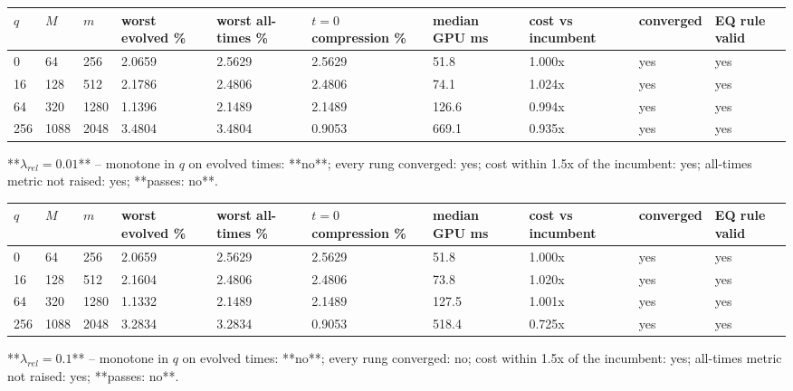 \documentclass[11pt]{article}
\begin{document}
\begin{table}[htbp]\centering\small
\begin{tabular}{llllllllll}\hline
$q$ & $M$ & $m$ & worst evolved \% & worst all-times \% & $t=0$ compression \% & median GPU ms & cost vs incumbent & converged & EQ rule valid \\ \hline
0 & 64 & 256 & 2.0659 & 2.5629 & 2.5629 & 51.8 & 1.000x & yes & yes \\
16 & 128 & 512 & 2.1786 & 2.4806 & 2.4806 & 74.1 & 1.024x & yes & yes \\
64 & 320 & 1280 & 1.1396 & 2.1489 & 2.1489 & 126.6 & 0.994x & yes & yes \\
256 & 1088 & 2048 & 3.4804 & 3.4804 & 0.9053 & 669.1 & 0.935x & yes & yes \\
\hline\end{tabular}
\end{table}
**$\lambda_{rel} = 0.01$** -- monotone in $q$ on evolved times: **no**; every rung converged: yes; cost within 1.5x of the incumbent: yes; all-times metric not raised: yes; **passes: no**.

\begin{table}[htbp]\centering\small
\begin{tabular}{llllllllll}\hline
$q$ & $M$ & $m$ & worst evolved \% & worst all-times \% & $t=0$ compression \% & median GPU ms & cost vs incumbent & converged & EQ rule valid \\ \hline
0 & 64 & 256 & 2.0659 & 2.5629 & 2.5629 & 51.8 & 1.000x & yes & yes \\
16 & 128 & 512 & 2.1604 & 2.4806 & 2.4806 & 73.8 & 1.020x & yes & yes \\
64 & 320 & 1280 & 1.1332 & 2.1489 & 2.1489 & 127.5 & 1.001x & yes & yes \\
256 & 1088 & 2048 & 3.2834 & 3.2834 & 0.9053 & 518.4 & 0.725x & yes & yes \\
\hline\end{tabular}
\end{table}
**$\lambda_{rel} = 0.1$** -- monotone in $q$ on evolved times: **no**; every rung converged: no; cost within 1.5x of the incumbent: yes; all-times metric not raised: yes; **passes: no**.
\end{document}
